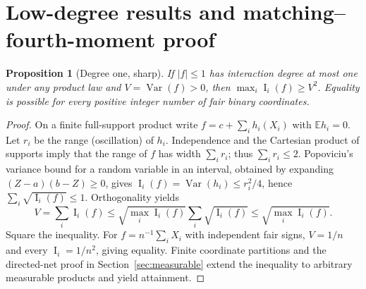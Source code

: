 \documentclass[11pt]{article}
\numberwithin{equation}{section}
\newtheorem{proposition}[theorem]{Proposition}
\theoremstyle{remark}
\newcommand{\E}{\mathbb E}
\newcommand{\Var}{\operatorname{Var}}
\newcommand{\Inf}{\operatorname{I}}
\begin{document}
\section{Low-degree results and matching--fourth-moment proof}\label{sec:lowdegree}
\begin{proposition}[Degree one, sharp]\label{prop:degone}
If $|f|\le1$ has interaction degree at most one under any product law and $V=\Var(f)>0$, then $\max_i\Inf_i(f)\ge V^2$. Equality is possible for every positive integer number of fair binary coordinates.
\end{proposition}
\begin{proof}
On a finite full-support product write $f=c+\sum_ih_i(X_i)$ with $\E h_i=0$. Let $r_i$ be the range (oscillation) of $h_i$. Independence and the Cartesian product of supports imply that the range of $f$ has width $\sum_ir_i$; thus $\sum_ir_i\le2$. Popoviciu's variance bound for a random variable in an interval, obtained by expanding $(Z-a)(b-Z)\ge0$, gives $\Inf_i(f)=\Var(h_i)\le r_i^2/4$, hence $\sum_i\sqrt{\Inf_i(f)}\le1$. Orthogonality yields
\[
 V=\sum_i\Inf_i(f)\le\sqrt{\max_i\Inf_i(f)}\sum_i\sqrt{\Inf_i(f)}
 \le\sqrt{\max_i\Inf_i(f)}.
\]
Square the inequality. For $f=n^{-1}\sum_iX_i$ with independent fair signs, $V=1/n$ and every $\Inf_i=1/n^2$, giving equality. Finite coordinate partitions and the directed-net proof in Section~\ref{sec:measurable} extend the inequality to arbitrary measurable products and yield attainment.
\end{proof}
\end{document}
